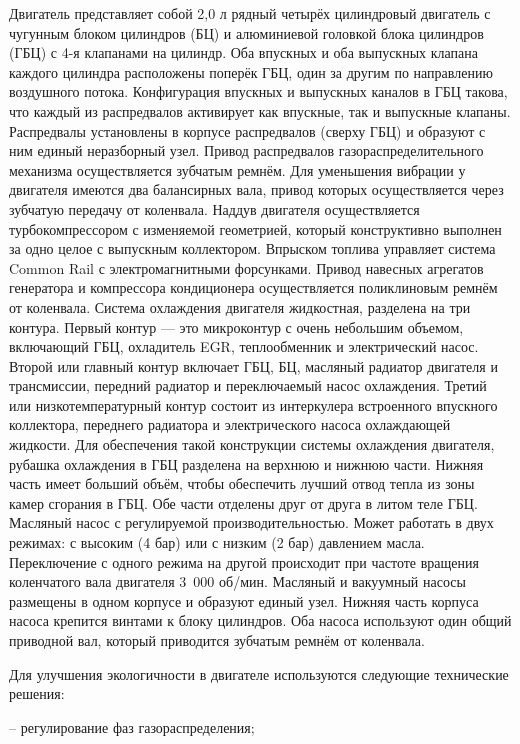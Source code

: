  Двигатель  представляет собой 2,0 л  рядный четырёх цилиндровый двигатель с чугунным блоком цилиндров (БЦ) и алюминиевой головкой блока цилиндров (ГБЦ) с 4-я клапанами на цилиндр. Оба впускных и оба выпускных клапана каждого цилиндра расположены поперёк ГБЦ, один за другим по направлению воздушного  потока. Конфигурация впускных и выпускных каналов в ГБЦ такова, что каждый из распредвалов активирует как впускные, так и выпускные клапаны. Распредвалы установлены в корпусе распредвалов (сверху ГБЦ) и образуют с ним единый неразборный узел. Привод распредвалов газораспределительного механизма  осуществляется зубчатым ремнём. Для уменьшения вибрации у двигателя имеются два балансирных вала, привод которых осуществляется через зубчатую передачу от коленвала. Наддув двигателя осуществляется турбокомпрессором  с изменяемой геометрией, который конструктивно выполнен за одно целое с выпускным коллектором. Впрыском топлива управляет система Common Rail с электромагнитными форсунками. Привод навесных агрегатов генератора и компрессора кондиционера осуществляется поликлиновым ремнём от коленвала. Система охлаждения двигателя жидкостная,  разделена на три контура. Первый контур — это микроконтур с очень небольшим объемом, включающий ГБЦ, охладитель EGR, теплообменник и электрический насос.  Второй или главный контур включает ГБЦ, БЦ, масляный радиатор двигателя и трансмиссии, передний радиатор и переключаемый насос охлаждения. Третий или низкотемпературный контур состоит из интеркулера встроенного впускного коллектора, переднего радиатора и электрического насоса охлаждающей жидкости. Для обеспечения такой конструкции системы охлаждения двигателя, рубашка охлаждения в ГБЦ разделена на верхнюю и нижнюю части. Нижняя часть имеет больший объём, чтобы обеспечить лучший отвод тепла из зоны камер сгорания в ГБЦ. Обе части отделены друг от друга в литом теле ГБЦ. Масляный насос с регулируемой производительностью. Может работать в двух режимах: с высоким (4 бар) или с низким (2 бар) давлением масла. Переключение с одного режима на другой происходит при частоте вращения коленчатого вала двигателя 3 000 об/мин. Масляный и вакуумный насосы размещены в одном корпусе и образуют единый узел. Нижняя часть корпуса насоса крепится винтами к блоку цилиндров. Оба насоса используют один общий приводной вал, который приводится зубчатым ремнём от коленвала.
 
 Для улучшения экологичности в двигателе используются следующие технические решения:
 
 -- регулирование фаз газораспределения;
 
